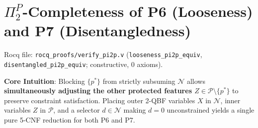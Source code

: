 \documentclass[11pt,a4paper]{article}
\newcommand{\N}{\mathcal{N}}
\newcommand{\Prot}{\mathcal{P}}
\newcommand{\code}[1]{\texttt{\small #1}}
\begin{document}
\section{\texorpdfstring{$\Pi_2^P$}{Pi\_2\^{}P}-Completeness of P6 (Looseness) and P7 (Disentangledness)}
Rocq file: \code{rocq\_proofs/verify\_pi2p.v} (\code{looseness\_pi2p\_equiv}, \code{disentangled\_pi2p\_equiv}; constructive, 0 axioms).

\textbf{Core Intuition}: Blocking $\{p^*\}$ from strictly subsuming $\N$ allows \textbf{simultaneously adjusting the other protected features $Z \in \Prot\setminus\{p^*\}$} to preserve constraint satisfaction. Placing outer 2-QBF variables $X$ in $\N$, inner variables $Z$ in $\Prot$, and a selector $d \in \N$ making $d=0$ unconstrained yields a single pure 5-CNF reduction for both P6 and P7.
\end{document}
